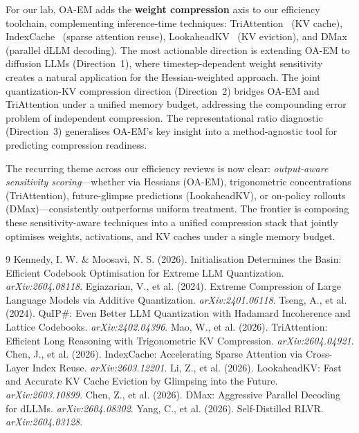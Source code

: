 \documentclass[11pt]{article}
\begin{document}
For our lab, OA-EM adds the \textbf{weight compression} axis to our efficiency toolchain, complementing inference-time techniques: TriAttention~\cite{triattention} (KV cache), IndexCache~\cite{indexcache} (sparse attention reuse), LookaheadKV~\cite{lookaheadkv} (KV eviction), and DMax~\cite{dmax} (parallel dLLM decoding). The most actionable direction is extending OA-EM to diffusion LLMs (Direction~1), where timestep-dependent weight sensitivity creates a natural application for the Hessian-weighted approach. The joint quantization-KV compression direction (Direction~2) bridges OA-EM and TriAttention under a unified memory budget, addressing the compounding error problem of independent compression. The representational ratio diagnostic (Direction~3) generalises OA-EM's key insight into a method-agnostic tool for predicting compression readiness.

The recurring theme across our efficiency reviews is now clear: \textit{output-aware sensitivity scoring}---whether via Hessians (OA-EM), trigonometric concentrations (TriAttention), future-glimpse predictions (LookaheadKV), or on-policy rollouts (DMax)---consistently outperforms uniform treatment. The frontier is composing these sensitivity-aware techniques into a unified compression stack that jointly optimises weights, activations, and KV caches under a single memory budget.

\begin{thebibliography}{9}
 Kennedy, I. W. \& Moosavi, N. S. (2026). Initialisation Determines the Basin: Efficient Codebook Optimisation for Extreme LLM Quantization. \textit{arXiv:2604.08118}.
 Egiazarian, V., et al. (2024). Extreme Compression of Large Language Models via Additive Quantization. \textit{arXiv:2401.06118}.
 Tseng, A., et al. (2024). QuIP\#: Even Better LLM Quantization with Hadamard Incoherence and Lattice Codebooks. \textit{arXiv:2402.04396}.
 Mao, W., et al. (2026). TriAttention: Efficient Long Reasoning with Trigonometric KV Compression. \textit{arXiv:2604.04921}.
 Chen, J., et al. (2026). IndexCache: Accelerating Sparse Attention via Cross-Layer Index Reuse. \textit{arXiv:2603.12201}.
 Li, Z., et al. (2026). LookaheadKV: Fast and Accurate KV Cache Eviction by Glimpsing into the Future. \textit{arXiv:2603.10899}.
 Chen, Z., et al. (2026). DMax: Aggressive Parallel Decoding for dLLMs. \textit{arXiv:2604.08302}.
 Yang, C., et al. (2026). Self-Distilled RLVR. \textit{arXiv:2604.03128}.
\end{thebibliography}
\end{document}
